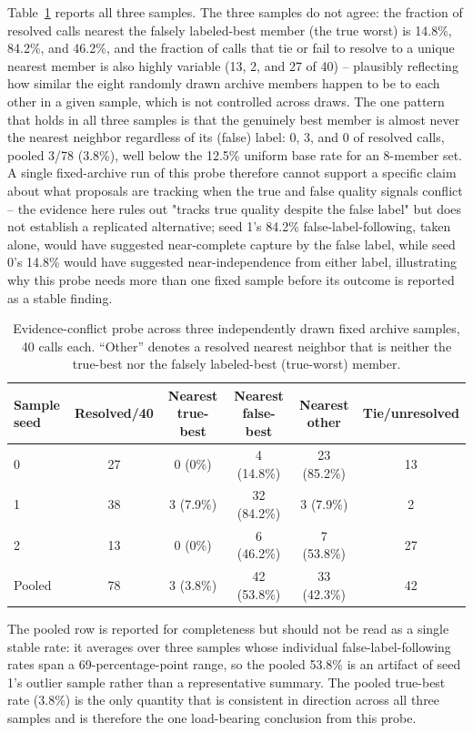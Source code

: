 Table~\ref{tab:conflict-samples} reports all three samples. The three samples do not agree: the fraction of resolved calls nearest the falsely labeled-best member (the true worst) is 14.8\%, 84.2\%, and 46.2\%, and the fraction of calls that tie or fail to resolve to a unique nearest member is also highly variable (13, 2, and 27 of 40) -- plausibly reflecting how similar the eight randomly drawn archive members happen to be to each other in a given sample, which is not controlled across draws. The one pattern that holds in all three samples is that the genuinely best member is almost never the nearest neighbor regardless of its (false) label: 0, 3, and 0 of resolved calls, pooled 3/78 (3.8\%), well below the 12.5\% uniform base rate for an 8-member set. A single fixed-archive run of this probe therefore cannot support a specific claim about what proposals are tracking when the true and false quality signals conflict -- the evidence here rules out "tracks true quality despite the false label" but does not establish a replicated alternative; seed 1's 84.2\% false-label-following, taken alone, would have suggested near-complete capture by the false label, while seed 0's 14.8\% would have suggested near-independence from either label, illustrating why this probe needs more than one fixed sample before its outcome is reported as a stable finding.

\begin{table}[htbp]
\caption{Evidence-conflict probe across three independently drawn fixed archive samples, 40 calls each. ``Other'' denotes a resolved nearest neighbor that is neither the true-best nor the falsely labeled-best (true-worst) member.}
\label{tab:conflict-samples}
\centering
\begin{tabular}{@{}lccccc@{}}
\toprule
Sample seed & Resolved/40 & Nearest true-best & Nearest false-best & Nearest other & Tie/unresolved \\
\midrule
0 & 27 & 0 (0\%) & 4 (14.8\%) & 23 (85.2\%) & 13 \\
1 & 38 & 3 (7.9\%) & 32 (84.2\%) & 3 (7.9\%) & 2 \\
2 & 13 & 0 (0\%) & 6 (46.2\%) & 7 (53.8\%) & 27 \\
\midrule
Pooled & 78 & 3 (3.8\%) & 42 (53.8\%) & 33 (42.3\%) & 42 \\
\bottomrule
\end{tabular}
\end{table}

The pooled row is reported for completeness but should not be read as a single stable rate: it averages over three samples whose individual false-label-following rates span a 69-percentage-point range, so the pooled 53.8\% is an artifact of seed 1's outlier sample rather than a representative summary. The pooled true-best rate (3.8\%) is the only quantity that is consistent in direction across all three samples and is therefore the one load-bearing conclusion from this probe.

